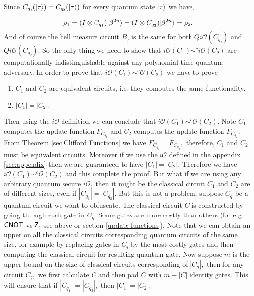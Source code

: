 \begin{itemize}
Since $C_{q_1}({\lvert}\tau\rangle)=C_{q_2}({\lvert}\tau\rangle)$ for every quantum state ${\lvert}\tau\rangle$ we have,

\begin{equation}
\label{eq:1}
\rho_1=(I\otimes C_{q_1}) {\lvert}\beta^{2n}\rangle=(I\otimes C_{q_2}) {\lvert}\beta^{2n}\rangle=\rho_2.
\end{equation}
And of course the bell measure circuit $B_q$ is the same for both $Qi\mathcal{O}(C_{q_1})$ and $Qi\mathcal{O}(C_{q_2}).$ So the only thing we need to show that $i\mathcal{O}(C_1)\sim^ci\mathcal{O}(C_2)$ are computationally indistinguishable against any polynomial-time quantum adversary. In order to prove that $i\mathcal{O}(C_1)\sim^c\mathcal{O}(C_2)$ we have to prove 

\begin{enumerate}
\item $C_1$ and $C_2$ are equivalent circuits, i.e. they computes the same functionality.
\item  $|C_1|=|C_2|.$
\end{enumerate}
Then using the $i\mathcal{O}$ definition we can conclude that $i\mathcal{O}(C_1)\sim^c\mathcal{O}(C_2).$ Note $C_1$ computes the update function $F_{C_{q_1}}$ and $C_2$ computes the update function $F_{C_{q_2}}.$ From Theorem \ref{sec:Clifford Functions} we have $F_{C_{q_1}}=F_{C_{q_2}},$ therefore, $C_1$ and $C_2$ must be equivalent circuits. Moreover if we use the $i\mathcal{O}$ defined in the appendix \ref{sec:appendix} then we are guaranteed to have $|C_1|=|C_2|.$ Therefore we have $i\mathcal{O}(C_1)\sim^c\mathcal{O}(C_2)$ and this complete the proof. But what if we are using any arbitrary quantum secure $i\mathcal{O},$ then it might be the classical circuit $C_1$ and $C_2$ are of different sizes, even if  $|C_{q_1}|=|C_{q_2}|.$  But this is not a problem, suppose $C_q$ be a quantum circuit we want to obfuscate. The classical circuit $C$ is constructed by going through each gate in $C_{q}.$ Some gates are more costly than others (for e.g ${\sf CNOT}$ vs ${\sf Z},$ see above or section \ref{update functions}). Note that we can obtain an upper on all the classical circuits corresponding quantum circuits of the same size, for example by replacing gates in $C_q$ by the most costly gates and then computing the classical circuit for resulting quantum gate. Now suppose $m$ is the upper bound on the size of classical circuits corresponding of $|C_q|,$ then for any circuit $C_q,$ we first calculate $C$ and then pad $C$ with $m-|C|$ identity gates. This will ensure that if $|C_{q_1}|=|C_{q_2}|,$ then $|C_1|=|C_2|.$
\end{itemize}


